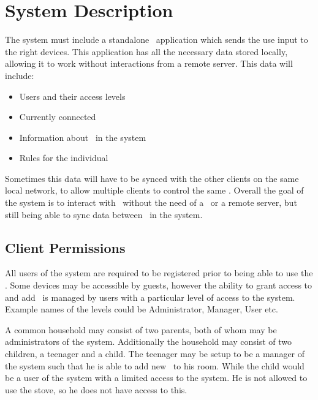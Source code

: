 \section{System Description}\label{sec:system-description}
The system must include a standalone \phone~application which sends the use input to the right devices. This application has all the necessary data stored locally, allowing it to work without interactions from a remote server. This data will include:

\begin{itemize}
\item Users and their access levels
\item Currently connected \phones
\item Information about \sdevs~in the system
\item Rules for the individual \sdevs
\end{itemize}

Sometimes this data will have to be synced with the other clients on the same local network, to allow multiple clients to control the same \sdevs. Overall the goal of the system is to interact with \sdevs~without the need of a \hub~or a remote server, but still being able to sync data between \phones~in the system. 

\subsection{Client Permissions} \label{sec:client-permissions}
All users of the system are required to be registered prior to being able to use the \phone. Some devices may be accessible by guests, however the ability to grant access to and add \sdevs~is managed by users with a particular level of access to the system. Example names of the levels could be Administrator, Manager, User etc. 

A common household may consist of two parents, both of whom may be administrators of the system. Additionally the household may consist of two children, a teenager and a child. The teenager may be setup to be a manager of the system such that he is able to add new \sdevs~to his room. While the child would be a user of the system with a limited access to the system. He is not allowed to use the stove, so he does not have access to this.



